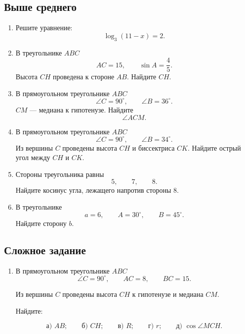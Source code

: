 \documentclass[a4paper,12pt]{article}
\begin{document}
\subsection*{Выше среднего}

\begin{enumerate}[label=\textbf{\arabic*.},resume]

\item Решите уравнение:
\[
\log_3(11-x)=2.
\]

\item В треугольнике \(ABC\)
\[
AC=15,
\qquad
\sin A=\frac45.
\]
Высота \(CH\) проведена к стороне \(AB\).
Найдите \(CH\).

\item В прямоугольном треугольнике \(ABC\)
\[
\angle C=90^\circ,
\qquad
\angle B=36^\circ.
\]
\(CM\) --- медиана к гипотенузе.
Найдите
\[
\angle ACM.
\]

\item В прямоугольном треугольнике \(ABC\)
\[
\angle C=90^\circ,
\qquad
\angle B=34^\circ.
\]
Из вершины \(C\) проведены высота \(CH\) и биссектриса \(CK\).
Найдите острый угол между \(CH\) и \(CK\).

\item Стороны треугольника равны
\[
5,\qquad7,\qquad8.
\]
Найдите косинус угла, лежащего напротив стороны \(8\).

\item В треугольнике
\[
a=6,\qquad
A=30^\circ,\qquad
B=45^\circ.
\]
Найдите сторону \(b\).

\end{enumerate}

\subsection*{Сложное задание}

\begin{enumerate}[label=\textbf{\arabic*.},resume]

\item В прямоугольном треугольнике \(ABC\)
\[
\angle C=90^\circ,
\qquad
AC=8,
\qquad
BC=15.
\]

Из вершины \(C\) проведены высота \(CH\) к гипотенузе и медиана \(CM\).

Найдите:

\[
\text{а) }AB;
\qquad
\text{б) }CH;
\qquad
\text{в) }R;
\qquad
\text{г) }r;
\qquad
\text{д) }\cos\angle MCH.
\]

\end{enumerate}
\end{document}

